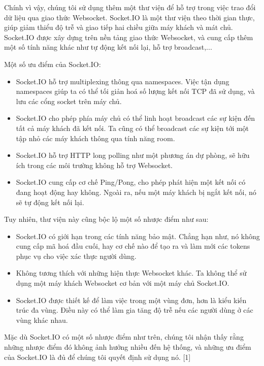 \par
Chính vì vậy, chúng tôi sử dụng thêm một thư viện để hỗ trợ trong việc trao đổi
dữ liệu qua giao thức Websocket. Socket.IO là một thư viện theo thời gian thực,
giúp giảm thiểu độ trễ và giao tiếp hai chiều giữa máy khách và mát chủ.
Socket.IO được xây dựng trên nền tảng giao thức Websocket, và cung cấp thêm một
số tính năng khác như tự động kết nối lại, hỗ trợ broadcast,...
\par
Một số ưu điểm của Socket.IO:
\begin{itemize}
    \item Socket.IO hỗ trợ multiplexing thông qua namespaces. Việc tận dụng namespaces
          giúp ta có thể tối giản hoá số lượng kết nối TCP đã sử dụng, và lưu các cổng
          socket trên máy chủ.
    \item Socket.IO cho phép phía máy chủ có thể linh hoạt broadcast các sự kiện đến tất
          cả máy khách đã kết nối. Ta cũng có thể broadcast các sự kiện tới một tập nhỏ
          các máy khách thông qua tính năng room.
    \item Socket.IO hỗ trợ HTTP long polling như một phương án dự phòng, sẽ hữu ích trong
          các môi trường không hỗ trợ Websocket.
    \item Socket.IO cung cấp cơ chế Ping/Pong, cho phép phát hiện một kết nối có đang
          hoạt động hay không. Ngoài ra, nếu một máy khách bị ngắt kết nối, nó sẽ tự động
          kết nối lại.
\end{itemize}
Tuy nhiên, thư viện này cũng bộc lộ một số nhược điểm như sau:
\begin{itemize}
    \item Socket.IO có giới hạn trong các tính năng bảo mật. Chẳng hạn như, nó không cung
          cấp mã hoá đầu cuối, hay cơ chế nào để tạo ra và làm mới các tokens phục vụ cho
          việc xác thực người dùng.
    \item Không tương thích với những hiện thực Websocket khác. Ta không thể sử dụng một
          máy khách Websocket cơ bản với một máy chủ Socket.IO.
    \item Socket.IO được thiết kế để làm việc trong một vùng đơn, hơn là kiểu kiến trúc
          đa vùng. Điều này có thể làm gia tăng độ trễ nếu các người dùng ở các vùng khác
          nhau.
\end{itemize}
\par
Mặc dù Socket.IO có một số nhược điểm như trên, chúng tôi nhận thấy rằng những
nhược điểm đó không ảnh hưởng nhiều đến hệ thống, và những ưu điểm của
Socket.IO là đủ để chúng tôi quyết định sử dụng nó. [1]

